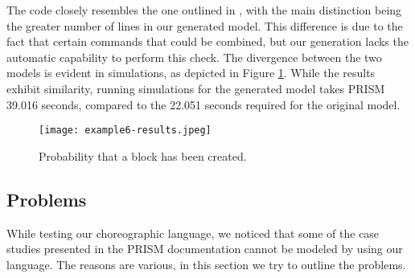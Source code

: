 \begin{comment}
   [NGRDF] (Network=0)  $\rightarrow$  
   	1 : (set2'=addBlockSet(set2,b2))$\&$(set3'=addBlockSet(set3,b3))$\&$(set4'=addBlockSet(set4,b4))$\&$(set5'=addBlockSet(set5,b5))$\&$(Network'=0); 
   [PCRLD] (Network=0)  $\rightarrow$  
   	1 : (set2'=addBlockSet(set2,b2))$\&$(set3'=addBlockSet(set3,b3))$\&$(set4'=addBlockSet(set4,b4))$\&$(set5'=addBlockSet(set5,b5))$\&$(Network'=0); 
   [MDDCF] (Network=0)  $\rightarrow$  1 : (set1' = removeBlock(set1,b1))$\&$(Network'=0); 
   [IQVPA] (Network=0)  $\rightarrow$  1 : (set1' = removeBlock(set1,b1))$\&$(Network'=0); 
   $\ldots$
endmodule

module Vote_Manager
   Vote_Manager : [0..1] init 0;
   epoch : [0..10] init 0;
   Votes : hash[];  
   tot_stake : [0..120000] init 50; 
   stake1 : [0..N] init 10; 
   stake2 : [0..N] init 10; 
   stake3 : [0..N] init 10; 
   stake4 : [0..N] init 10; 
   stake5 : [0..N] init 10; 

   [VSJBE] (Vote_Manager=0)  $\rightarrow$  
   	1 : (Votes'=addVote(Votes,b1,stake1))$\&$(Vote_Manager'=0); 
   $\ldots$
endmodule

\end{lstlisting}
\end{comment}
The code closely resembles the one outlined in \cite{DBLP:journals/distribledger/GallettaLMV23}, with the main distinction being the greater number of lines in our generated model. This difference is due to the fact that certain commands that could be combined, but our generation lacks the automatic capability to perform this check. The divergence between the two models is evident in simulations, as depicted in Figure \ref{ex5-res}. While the results exhibit similarity, running simulations for the generated model takes PRISM 39.016 seconds, compared to the 22.051 seconds required for the original model.

\begin{figure}[h]
\centering
\texttt{[image: example6-results.jpeg]}	
\caption{Probability that a block has been created.}
\label{ex5-res}
\end{figure}



\subsection{Problems}
\label{sec:problems}
While testing our choreographic language, we noticed that some of the case studies presented in the 
PRISM documentation \cite{PRISMdoc} cannot be modeled by using our language.
The reasons are various, in this section we try to outline the problems.

